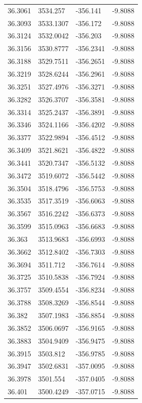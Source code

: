 \begin{table}[H]
\begin{tabular}{llll}
36.3061 & 3534.257 & -356.141 & -9.8088 \\
36.3093 & 3533.1307 & -356.172 & -9.8088 \\
36.3124 & 3532.0042 & -356.203 & -9.8088 \\
36.3156 & 3530.8777 & -356.2341 & -9.8088 \\
36.3188 & 3529.7511 & -356.2651 & -9.8088 \\
36.3219 & 3528.6244 & -356.2961 & -9.8088 \\
36.3251 & 3527.4976 & -356.3271 & -9.8088 \\
36.3282 & 3526.3707 & -356.3581 & -9.8088 \\
36.3314 & 3525.2437 & -356.3891 & -9.8088 \\
36.3346 & 3524.1166 & -356.4202 & -9.8088 \\
36.3377 & 3522.9894 & -356.4512 & -9.8088 \\
36.3409 & 3521.8621 & -356.4822 & -9.8088 \\
36.3441 & 3520.7347 & -356.5132 & -9.8088 \\
36.3472 & 3519.6072 & -356.5442 & -9.8088 \\
36.3504 & 3518.4796 & -356.5753 & -9.8088 \\
36.3535 & 3517.3519 & -356.6063 & -9.8088 \\
36.3567 & 3516.2242 & -356.6373 & -9.8088 \\
36.3599 & 3515.0963 & -356.6683 & -9.8088 \\
36.363 & 3513.9683 & -356.6993 & -9.8088 \\
36.3662 & 3512.8402 & -356.7303 & -9.8088 \\
36.3694 & 3511.712 & -356.7614 & -9.8088 \\
36.3725 & 3510.5838 & -356.7924 & -9.8088 \\
36.3757 & 3509.4554 & -356.8234 & -9.8088 \\
36.3788 & 3508.3269 & -356.8544 & -9.8088 \\
36.382 & 3507.1983 & -356.8854 & -9.8088 \\
36.3852 & 3506.0697 & -356.9165 & -9.8088 \\
36.3883 & 3504.9409 & -356.9475 & -9.8088 \\
36.3915 & 3503.812 & -356.9785 & -9.8088 \\
36.3947 & 3502.6831 & -357.0095 & -9.8088 \\
36.3978 & 3501.554 & -357.0405 & -9.8088 \\
36.401 & 3500.4249 & -357.0715 & -9.8088 \\

\end{tabular}
\end{table}
